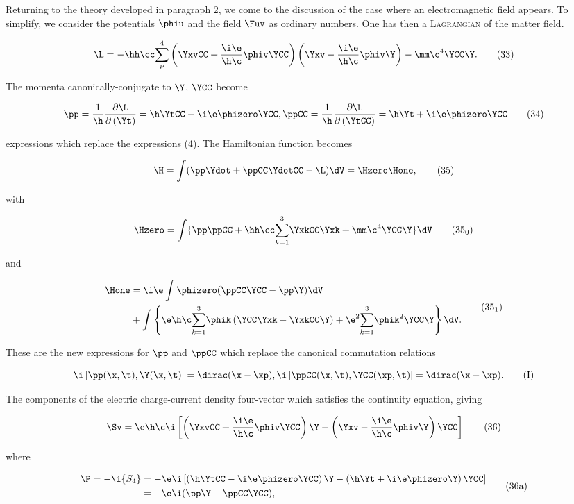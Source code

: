 \documentclass{article}
\newcommand{\var}[1]{#1}
\newcommand{\comp}[1]{{#1}}
\newcommand{\inv}[1]{\frac{1}{#1}}
\newcommand{\Si}[1]{{\var{S}_\comp{#1}}}
\newcommand{\commutator}[2]{\left[ #1, #2 \right]}
\renewcommand{\sc}[1]{\textsc{#1}}
\newcommand{\sumXY}[2]{\underset{#1}{\overset{#2}{\sum}}}
\newcommand{\nequ}[2]{
\begin{equation*}
#1
\tag{#2}
\end{equation*}
}
\begin{document}
Returning to the theory developed in paragraph 2, we come to the discussion of the case where an electromagnetic field appears. To simplify, we consider the potentials $\phiu$ and the field $\Fuv$ as ordinary numbers. One has then a \sc{Lagrangian} of the matter field.

\nequ{
\L = -\hh\cc\sumXY{\nu}{4}\left(
\YxvCC + \frac{\i\e}{\h\c}\phiv\YCC
\right)\left(
\Yxv - \frac{\i\e}{\h\c}\phiv\Y
\right) - \mm\c^4\YCC\Y.
}{33}

The momenta canonically-conjugate to $\Y$, $\YCC$ become

\nequ{
\pp   = \inv{\h}\frac{\partial\L}{\partial\left(\Yt\right)} = \h\YtCC - \i\e\phizero\YCC,
\ppCC = \inv{\h}\frac{\partial\L}{\partial\left(\YtCC\right)} = \h\Yt + \i\e\phizero\YCC
}{34}

expressions which replace the expressions (4). The Hamiltonian function becomes

\nequ{
\H = \int(\pp\Ydot + \ppCC\YdotCC - \L)\dV = \Hzero \Hone,
}{35}

with

\nequ{
\Hzero = \int\lbrace
\pp\ppCC + \hh\cc\sumXY{k=1}{3}\YxkCC\Yxk + \mm\c^4\YCC\Y
\rbrace\dV
}{$35_0$}

and

\nequ{
\begin{split}
\Hone &= \i\e\int\phizero(\ppCC\YCC - \pp\Y)\dV \\
      &+ \int\left\{
\e\h\c\sumXY{k=1}{3}\phik\left(
\YCC\Yxk - \YxkCC\Y
\right) + \e^2 \sumXY{k=1}{3}\phik^2\YCC\Y\right\}\dV.
\end{split}
}{$35_1$}

These are the new expressions for $\pp$ and $\ppCC$ which replace the canonical commutation relations

\nequ{
\i\commutator{\pp(\x, \t)}{\Y(\x,\t)} = \dirac(\x - \xp),
\i\commutator{\ppCC(\x, \t)}{\YCC(\xp, \t)} = \dirac(\x - \xp).
}{I}

The components of the electric charge-current density four-vector which satisfies the continuity equation, giving

\nequ{
\Sv = \e\h\c\i\left[
\left(
\YxvCC + \frac{\i\e}{\h\c}\phiv\YCC
\right)\Y - \left(
\Yxv - \frac{\i\e}{\h\c}\phiv\Y
\right)\YCC
\right]
}{36}

where

\nequ{
\begin{split}
\P = -\i\Si{4} &= -\e\i\left[
\left(
\h\YtCC - \i\e\phizero\YCC
\right)\Y - \left(
\h\Yt + \i\e\phizero\Y
\right)\YCC
\right] \\
 &= -\e\i(\pp\Y - \ppCC\YCC),
\end{split}
}{36a}
\end{document}
